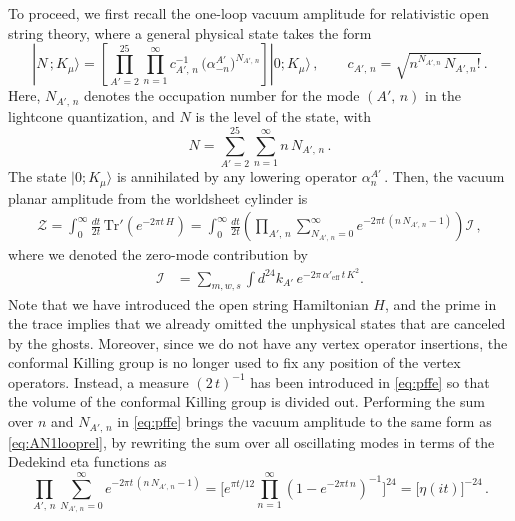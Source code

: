 \documentclass[11pt]{article}
\newcommand{\be}{\begin{equation}}
\newcommand{\ee}{\end{equation}}
\newcommand{\CI}{\mathcal{I}}
\newcommand{\lr}{\left (}
\newcommand{\rr}{\right )}
\newcommand{\ls}{\left [}
\newcommand{\rs}{\right ]}
\begin{document}
To proceed, we first recall the one-loop vacuum amplitude for relativistic open string theory, where a general physical state takes the form \cite{Polchinski:1998rq}
%
\be
    | N\,; K_\mu \rangle = \ls \prod_{A'=2}^{25} \prod_{n=1}^\infty c^{-1}_{A'\!,\,n} \, \bigl( \alpha^{A'}_{-n} \bigr)^{N_{A'\!, \, n}} \rs |0; K_\mu \rangle\,,  
        \qquad%
    c_{A'\!, \,n} = \sqrt{n^{N_{A', n}} \, N_{A'\!, n}!}\,.
\ee
%
Here, $N_{A'\!,\, n}$ denotes the occupation number for the mode $(A'\!, \, n)$ in the lightcone quantization, and $N$ is the level of the state, with
%
\be 
    N = \sum_{A'=2}^{25} \sum_{n=1}^\infty n \, N_{A'\!, \, n}\,.
\ee
%
The state $|0; K_\mu\rangle$ is annihilated by any lowering operator $\alpha^{A'}_{n}$\,. Then, the vacuum planar amplitude from the worldsheet cylinder is
%
\begin{align} \label{eq:pffe}
    \mathcal{Z} = \int_0^\infty \frac{dt}{2t} \, \text{Tr}' \left( e^{-2\pi t \, H} \right) 
    = \int_0^\infty \frac{dt}{2t} \lr  \prod_{A'\!,\,n} \sum_{N_{A'\!,\,n}=0}^\infty e^{-2\pi t \, (n \, N_{A'\!,\,n}-1)} \rr \CI\,, 
\end{align}
%
where we denoted
%
the zero-mode contribution by
%
\begin{align} \label{eq:ci}
    \CI & = \sum_{m, w, s} \int d^{24}k_{A'} \, e^{-2 \pi \, \alpha'_\text{eff} \, t \, K^2}.
\end{align}
%
Note that we have introduced the open string Hamiltonian $H$, and the prime in the trace implies that we already omitted the unphysical states that are canceled by the ghosts. Moreover, since we do not have any vertex operator insertions, the conformal Killing group is no longer used to fix any position of the vertex operators. Instead, a measure $(2\,t)^{-1}$ has been introduced in \eqref{eq:pffe} so that the volume of the conformal Killing group is divided out. Performing the sum over $n$ and $N_{A'\!,\,n}$ in \eqref{eq:pffe} brings the vacuum amplitude to the same form as \eqref{eq:AN1looprel}, by rewriting the sum over all oscillating modes in terms of the Dedekind eta functions as
%
\be \label{eq:iddeta}
    \prod_{A'\!,\,n} \sum_{N_{A'\!,\,n}=0}^\infty e^{-2\pi t \, (n \, N_{A'\!,\,n}-1)} = \biggl[ e^{\pi t/12} \prod_{n=1}^\infty \lr 1- e^{-2\pi t \, n} \rr^{-1} \bigg]^{24} = \bigl[ \eta (it) \bigr]^{-24}\,.
\ee
\end{document}
